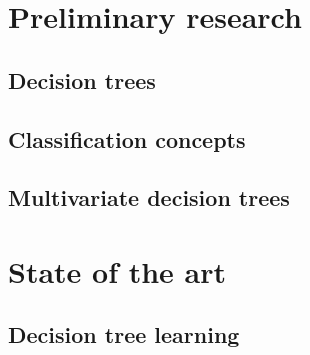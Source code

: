\documentclass[12pt]{report}
\theoremstyle{definition}
\theoremstyle{definition}
\begin{document}
\chapter{Preliminary research}
\section{Decision trees}
\section{Classification concepts} %
\section{Multivariate decision trees}


\chapter{State of the art}
\section{Decision tree learning} %
\end{document}
